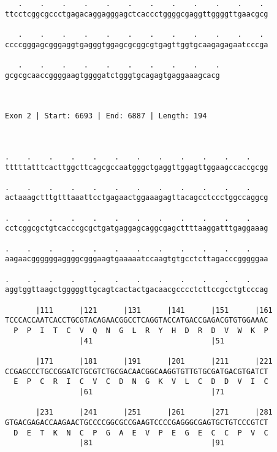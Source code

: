\documentclass{article}
\begin{document}
\begin{Verbatim}
   .    .    .    .    .    .    .    .    .    .    .    . 
ttcctcggcgccctgagacaggagggagctcaccctggggcgaggttggggttgaacgcg
                                                            
   .    .    .    .    .    .    .    .    .    .    .    . 
ccccgggagcgggaggtgagggtggagcgcggcgtgagttggtgcaagagagaatcccga
                                                            
   .    .    .    .    .    .    .    .    .    .
gcgcgcaaccggggaagtggggatctgggtgcagagtgaggaaagcacg
                                                 
                                                 
 
Exon 2 | Start: 6693 | End: 6887 | Length: 194



.    .    .    .    .    .    .    .    .    .    .    .    
tttttatttcacttggcttcagcgccaatgggctgaggttggagttggaagccaccgcgg
                                                            
.    .    .    .    .    .    .    .    .    .    .    .    
actaaagctttgtttaaattcctgagaactggaaagagttacagcctccctggccaggcg
                                                            
.    .    .    .    .    .    .    .    .    .    .    .    
cctcggcgctgtcacccgcgctgatgaggagcaggcgagcttttaaggatttgaggaaag
                                                            
.    .    .    .    .    .    .    .    .    .    .    .    
aagaacggggggaggggcgggaagtgaaaaatccaagtgtgcctcttagacccgggggaa
                                                            
.    .    .    .    .    .    .    .    .    .    .    .    
aggtggttaagctgggggttgcagtcactactgacaacgcccctcttccgcctgtcccag
                                                            
       |111      |121      |131      |141      |151      |161
TCCCACCAATCACCTGCGTACAGAACGGCCTCAGGTACCATGACCGAGACGTGTGGAAAC
  P  P  I  T  C  V  Q  N  G  L  R  Y  H  D  R  D  V  W  K  P
                 |41                           |51          
  
       |171      |181      |191      |201      |211      |221
CCGAGCCCTGCCGGATCTGCGTCTGCGACAACGGCAAGGTGTTGTGCGATGACGTGATCT
  E  P  C  R  I  C  V  C  D  N  G  K  V  L  C  D  D  V  I  C
                 |61                           |71          
  
       |231      |241      |251      |261      |271      |281
GTGACGAGACCAAGAACTGCCCCGGCGCCGAAGTCCCCGAGGGCGAGTGCTGTCCCGTCT
  D  E  T  K  N  C  P  G  A  E  V  P  E  G  E  C  C  P  V  C
                 |81                           |91          
  

\end{Verbatim}
\end{document}

